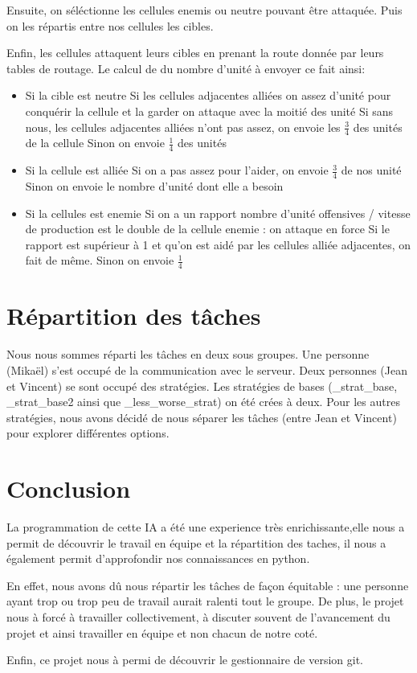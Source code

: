 \documentclass{rapport}
\begin{document}
			Ensuite, on séléctionne les cellules enemis ou neutre pouvant être attaquée. Puis on les répartis entre nos cellules les cibles.

			Enfin, les cellules attaquent leurs cibles en prenant la route donnée par leurs tables de routage.
			Le calcul de du nombre d'unité à envoyer ce fait ainsi:
			\begin{itemize}
					\item Si la cible est neutre
						\subitem Si les cellules adjacentes alliées on assez d'unité pour conquérir la cellule et la garder on attaque avec la moitié des unité
						\subitem Si sans nous, les cellules adjacentes alliées n'ont pas assez, on envoie les $\frac{3}{4}$ des unités de la cellule
						\subitem Sinon on envoie $\frac{1}{4}$ des unités
					\item Si la cellule est alliée
						\subitem Si on a pas assez pour l'aider, on envoie $\frac{3}{4}$ de nos unité
						\subitem Sinon on envoie le nombre d'unité dont elle a besoin
					\item Si la cellules est enemie
						\subitem Si on a un rapport nombre d'unité offensives / vitesse de production est le double de la cellule enemie : on attaque en force
						\subitem Si le rapport est supérieur à 1 et qu'on est aidé par les cellules alliée adjacentes, on fait de même.
						\subitem Sinon on envoie $\frac{1}{4}$
			\end{itemize}
	\chapter{Répartition des tâches}
		Nous nous sommes réparti les tâches en deux sous groupes. Une personne (Mikaël) s'est occupé de la communication
		avec le serveur. Deux personnes (Jean et Vincent) se sont occupé des stratégies. Les stratégies de bases (\_strat\_base, \_strat\_base2 ainsi que \_less\_worse\_strat) on été crées à deux. Pour les autres stratégies, nous avons décidé de nous séparer les tâches (entre Jean et Vincent) pour explorer différentes options.
	\chapter*{Conclusion}
La programmation de cette IA a été une experience très enrichissante,elle nous a permit de découvrir le travail en équipe et la répartition des taches, 
il nous a également permit d'approfondir nos connaissances en python.

En effet, nous avons dû nous répartir les tâches de façon équitable : une personne ayant trop ou trop peu de travail aurait ralenti tout le groupe.
De plus, le projet nous à forcé à travailler collectivement, à discuter souvent de l'avancement du projet et ainsi travailler en équipe et non chacun 
de notre coté.

Enfin, ce projet nous à permi de découvrir le gestionnaire de version git.
	\printindex
\end{document}
